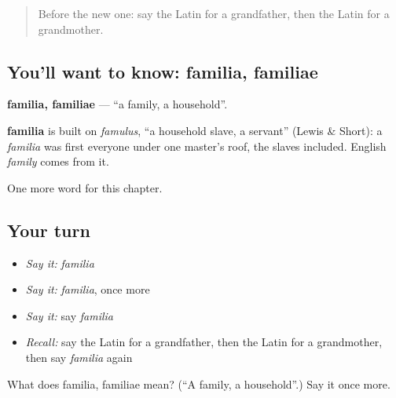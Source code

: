 \label{lesson:LA-C70-familia}



\begin{quote}
Before the new one: say the Latin for a grandfather, then the Latin for a grandmother.
\end{quote}

\subsection*{You'll want to know: familia, familiae}
\textbf{familia, familiae} — \textquotedblleft{}a family, a household\textquotedblright{}.

\begin{cousinweb}
\textbf{familia} is built on \emph{famulus}, \textquotedblleft{}a household slave, a servant\textquotedblright{} (Lewis \& Short): a \emph{familia} was first everyone under one master's roof, the slaves included. English \emph{family} comes from it.
\end{cousinweb}

\begin{grammarlens}[title={What you've built}]
One more word for this chapter.
\end{grammarlens}

\subsection*{Your turn}
\begin{itemize}
\raggedright
  \item \emph{Say it:} \emph{familia}
  \item \emph{Say it:} \emph{familia}, once more
  \item \emph{Say it:} say \emph{familia}
  \item \emph{Recall:} say the Latin for a grandfather, then the Latin for a grandmother, then say \emph{familia} again
\end{itemize}

\begin{tcolorbox}[breakable,colback=teal!4,colframe=teal!35!black,title={Before you move on}]
What does familia, familiae mean? (\textquotedblleft{}A family, a household\textquotedblright{}.) Say it once more.
\end{tcolorbox}
